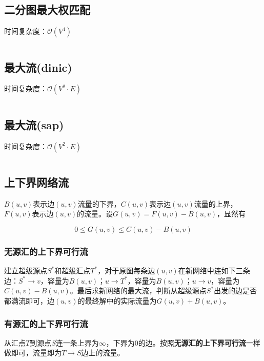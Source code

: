 \documentclass[landscape, oneside, a4paper, cs4size]{book}
\newcommand{\cppcode}[1]{
	\inputminted[mathescape,
	frame=lines,linenos]{cpp}{source/#1}
}
\begin{document}
\begin{multicols}{2}
\begin{spacing}{0.8}
\subsection{二分图最大权匹配}


时间复杂度：$\mathcal{O}(V^4)$


\cppcode{graph-theory/maximum-weight-matching.cpp}


\subsection{最大流(dinic)}

时间复杂度：$\mathcal{O}(V^2 \cdot E)$

\cppcode{graph-theory/dinic.cpp}



\subsection{最大流(sap)}

时间复杂度：$\mathcal{O}(V^2 \cdot E)$

\cppcode{graph-theory/Sap.cpp}



\subsection{上下界网络流}


$B(u,v)$表示边$(u,v)$流量的下界，$C(u,v)$表示边$(u,v)$流量的上界，$F(u,v)$表示边$(u,v)$的流量。设$G(u,v) = F(u,v) - B(u,v)$，显然有

$$0 \leq G(u,v) \leq C(u,v)-B(u,v)$$


\subsubsection{无源汇的上下界可行流}


建立超级源点$S^*$和超级汇点$T^*$，对于原图每条边$(u,v)$在新网络中连如下三条边：$S^* \rightarrow v$，容量为$B(u,v)$；$u \rightarrow T^*$，容量为$B(u,v)$；$u \rightarrow v$，容量为$C(u,v) - B(u,v)$。最后求新网络的最大流，判断从超级源点$S^*$出发的边是否都满流即可，边$(u,v)$的最终解中的实际流量为$G(u,v)+B(u,v)$。


\subsubsection{有源汇的上下界可行流}


从汇点$T$到源点$S$连一条上界为$\infty$，下界为$0$的边。按照\textbf{无源汇的上下界可行流}一样做即可，流量即为$T \rightarrow S$边上的流量。



\end{spacing}
\end{multicols}
\end{document}
